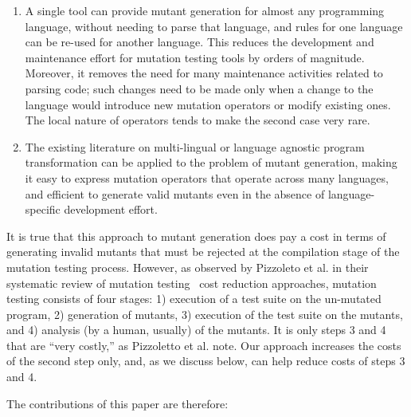 \documentclass[sigconf,review, anonymous]{acmart}
\begin{document}
\begin{enumerate}
  \item A single tool can provide mutant generation for almost any
    programming language, without needing to parse that language, and
    rules for one language can be re-used for another language.  This
    reduces the development and maintenance effort for mutation
    testing tools by orders of magnitude.  Moreover, it removes the
    need for many   maintenance activities related to parsing code;
    such changes need to be made only when a change to the language
    would introduce new mutation operators or modify existing ones.
    The local nature of operators tends to make the second case very rare.
    \item The existing literature on multi-lingual or language
      agnostic program transformation can be applied to the problem of
      mutant generation, making it easy to express mutation operators
      that operate across many languages, and efficient to generate
      valid mutants even in the absence of language-specific
      development effort.
      \end{enumerate}

It is true that this approach to mutant generation does pay a cost in
terms of generating invalid mutants that must be rejected at the
compilation stage of the mutation testing process.  However, as
observed by Pizzoleto et al. in their systematic review of mutation
testing~\cite{pizzoleto2019systematic} cost reduction approaches, mutation testing consists of four
stages: 1) execution of a test suite on the un-mutated program, 2)
generation of mutants, 3) execution of the test suite on the mutants,
and 4) analysis (by a human, usually) of the mutants.  It is only steps 3
and 4 that are ``very costly,'' as Pizzoletto et al. note.  Our approach increases the costs of
the second step only, and, as we discuss below, can help reduce
costs of steps 3 and 4.
      
The contributions of this paper are therefore:
\end{document}
